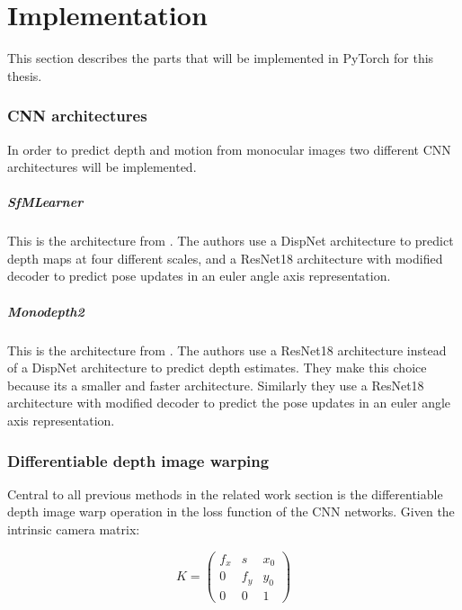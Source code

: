 \chapter{Implementation}

This section describes the parts that will be implemented in PyTorch for this thesis.







\iffalse

\subsection{CNN architectures}

In order to predict depth and motion from monocular images two different CNN architectures will be implemented.

\paragraph{SfMLearner} This is the architecture from \cite{sfmlearner}. The authors use a DispNet\cite{dispnet} architecture to predict depth maps at four different scales, and a ResNet18\cite{resnet} architecture with modified decoder to predict pose updates in an euler angle axis representation.

\paragraph{Monodepth2} This is the architecture from \cite{monodepth2}. The authors use a ResNet18 architecture instead of a DispNet architecture to predict depth estimates. They make this choice because its a smaller and faster architecture. Similarly they use a ResNet18 architecture with modified decoder to predict the pose updates in an euler angle axis representation.

\subsection{Differentiable depth image warping}
\label{sec:diffwarp}

Central to all previous methods in the related work section is the differentiable depth image warp operation in the loss function of the CNN networks. Given the intrinsic camera matrix:

\[
K = 
\begin{pmatrix}
f_x & s & x_0 \\
0 & f_y & y_0 \\
0 & 0   & 1
\end{pmatrix}
\]

